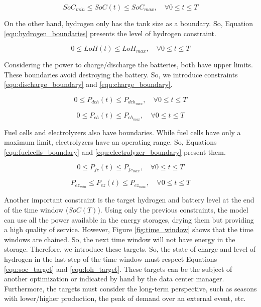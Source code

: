 \begin{equation}
    \label{equ:battery_boundaries}
    SoC_{min} \leq SoC(t) \leq SoC_{max}, \quad \forall 0 \le t \le T
\end{equation}

On the other hand, hydrogen only has the tank size as a boundary. So, Equation \ref{equ:hydrogen_boundaries} presents the level of hydrogen constraint.

\begin{equation}
    \label{equ:hydrogen_boundaries}
    0 \leq LoH(t) \leq LoH_{max}, \quad \forall 0 \le t \le T
\end{equation}

Considering the power to charge/discharge the batteries, both have upper limits. These boundaries avoid destroying the battery. So, we introduce constraints \ref{equ:discharge_boundary} and \ref{equ:charge_boundary}.

\begin{equation}
    \label{equ:discharge_boundary}
    0 \leq P_{dch}(t) \leq P_{dch_{max}}, \quad \forall 0 \le t \le T
\end{equation}

\begin{equation}
    \label{equ:charge_boundary}
    0 \leq P_{ch}(t) \leq P_{ch_{max}}, \quad \forall 0 \le t \le T
\end{equation}

Fuel cells and electrolyzers also have boundaries. While fuel cells have only a maximum limit, electrolyzers have an operating range. So, Equations \ref{equ:fuelcells_boundary} and \ref{equ:electrolyzer_boundary} present them.

\begin{equation}
    \label{equ:fuelcells_boundary}
    0 \leq P_{fc}(t) \leq P_{fc_{max}}, \quad \forall 0 \le t \le T
\end{equation}

\begin{equation}
    \label{equ:electrolyzer_boundary}
    P_{ez_{min}} \leq P_{ez}(t) \leq P_{ez_{max}}, \quad \forall 0 \le t \le T
\end{equation}

Another important constraint is the target hydrogen and battery level at the end of the time window ($SoC(T)$). Using only the previous constraints, the model can use all the power available in the energy storages, drying them but providing a high quality of service. However, Figure \ref{fig:time_window} shows that the time windows are chained. So, the next time window will not have energy in the storage. Therefore, we introduce these targets. So, the state of charge and level of hydrogen in the last step of the time window must respect Equations \ref{equ:soc_target} and \ref{equ:loh_target}. These targets can be the subject of another optimization or indicated by hand by the data center manager. Furthermore, the targets must consider the long-term perspective, such as seasons with lower/higher production, the peak of demand over an external event, etc. 

